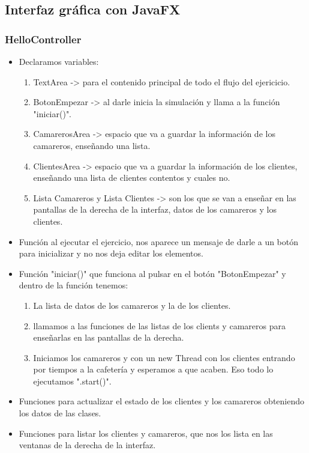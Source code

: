 \documentclass[a4paper,12pt]{article}
\begin{document}
\subsection{Interfaz gráfica con JavaFX}

\subsubsection{HelloController}
\begin{itemize}
\item Declaramos variables:
    \begin{enumerate}
        \item TextArea -> para el contenido principal de todo el flujo del ejericicio.
        \item BotonEmpezar -> al darle inicia la simulación y llama a la función "iniciar()".
        \item CamarerosArea -> espacio que va a guardar la información de los camareros, enseñando una lista.
        \item ClientesArea -> espacio que va a guardar la información de los clientes, enseñando una lista de clientes contentos y cuales no.
        \item Lista Camareros y Lista Clientes -> son los que se van a enseñar en las pantallas de la derecha de la interfaz, datos de los camareros y los clientes.
    \end{enumerate}
\item Función al ejecutar el ejercicio, nos aparece un mensaje de darle a un botón para inicializar y no nos deja editar los elementos.
\item Función "iniciar()" que funciona al pulsar en el botón "BotonEmpezar" y dentro de la función tenemos:
    \begin{enumerate}
        \item La lista de datos de los camareros y la de los clientes.
        \item llamamos a las funciones de las listas de los clients y camareros para enseñarlas en las pantallas de la derecha.
        \item Iniciamos los camareros y con un new Thread con los clientes entrando por tiempos a la cafetería y esperamos a que acaben. Eso todo lo ejecutamos ".start()".
    \end{enumerate}
\item Funciones para actualizar el estado de los clientes y los camareros obteniendo los datos de las clases. 
\item Funciones para listar los clientes y camareros, que nos los lista en las ventanas de la derecha de la interfaz.
\end{itemize}
\end{document}

